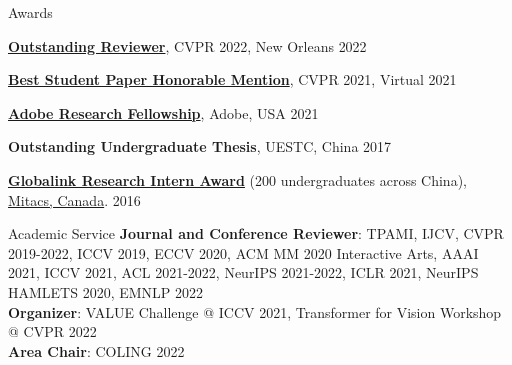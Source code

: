 \documentclass{resume} %
\begin{document}
\begin{rSection}{Awards}
\item {\textbf{\href{https://cvpr2022.thecvf.com/outstanding-reviewers}{Outstanding Reviewer}}, CVPR 2022, New Orleans } \hfill {2022}        
\item {\textbf{\href{http://cvpr2021.thecvf.com/node/329}{Best Student Paper Honorable Mention}}, CVPR 2021, Virtual } \hfill {2021}    
\item {\textbf{\href{https://research.adobe.com/fellowship/}{Adobe Research Fellowship}}, Adobe, USA} \hfill {2021}    
\item {\textbf{Outstanding Undergraduate Thesis}, UESTC, China} \hfill {2017} 
\item {\textbf{\href{https://www.mitacs.ca/en/programs/globalink/globalink-research-internship}{Globalink Research Intern Award}} (200 undergraduates across China), \href{https://www.mitacs.ca/en}{Mitacs, Canada}. } \hfill {2016}
\end{rSection}


\newpage



\begin{rSection}{Academic Service}
    \textbf{Journal and Conference Reviewer}: TPAMI, IJCV, CVPR 2019-2022, ICCV 2019, ECCV 2020, ACM MM 2020 Interactive Arts, AAAI 2021, ICCV 2021, ACL 2021-2022, NeurIPS 2021-2022, ICLR 2021, NeurIPS HAMLETS 2020, EMNLP 2022 \\
    \textbf{Organizer}:  VALUE Challenge @ ICCV 2021, Transformer for Vision Workshop @ CVPR 2022 \\
    \textbf{Area Chair}: COLING 2022
    
\end{rSection}



    
\end{document}
